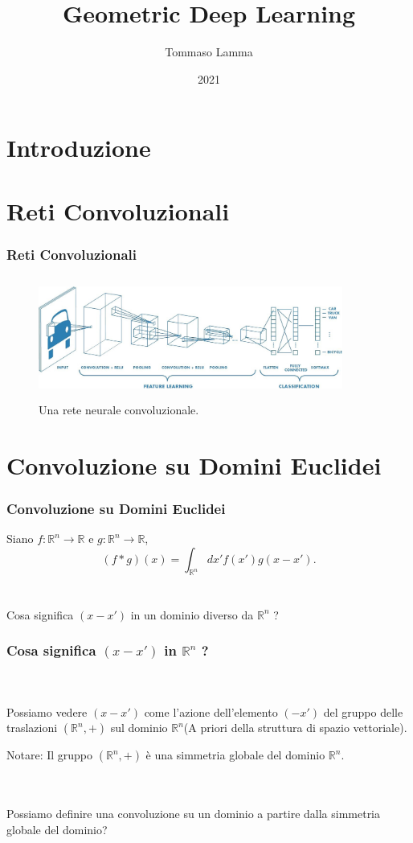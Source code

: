 \documentclass[xcolor=dvipsnames]{beamer}
\title{Geometric Deep Learning}
\author{Tommaso Lamma}
\date{2021}
\newcommand{\R}{\mathbb{R}}
\begin{document}
\titlepage

\tableofcontents

\section{Introduzione}

\frame{\titlepage}

\section{Reti Convoluzionali}

\begin{frame}
    \frametitle{Reti Convoluzionali}
    \begin{figure}[H]
        \centering
        \includegraphics[width=10cm, height=4cm]{cnn}
        \caption{Una rete neurale convoluzionale.}
    \end{figure}       
\end{frame}

\section{Convoluzione su Domini Euclidei}

\begin{frame}
    \frametitle{Convoluzione su Domini Euclidei}    
    Siano $f:\R^n \to \R$ e $g:\R^n \to \R$,
    \[ (f * g)(x) = \int_{\R^n} dx' f(x')g(x-x'). \]
    \hfill \\
    \hfill \\
    { \large Cosa significa $(x - x')$ in un dominio diverso da $\R^n$ ?}
\end{frame}

\begin{frame}
    \frametitle{ \large Cosa significa $(x - x')$ \textbf{in} $\R^n$ ?}
    \hfill \\
    \hfill \\
    Possiamo vedere $( x - x')$ come l'azione dell'elemento $(-x')$ del gruppo delle traslazioni $(\R^n, +)$
    sul dominio $\R^n$(A priori della struttura di spazio vettoriale).
    \begin{block}{Notare:}
        Il gruppo $(\R^n, +)$ è una simmetria globale del dominio $\R^n$.  
    \end{block}
    \hfill \\
    \hfill \\
    {\large Possiamo definire una convoluzione su un dominio a partire dalla simmetria globale del dominio?}
\end{frame}
\end{document}
